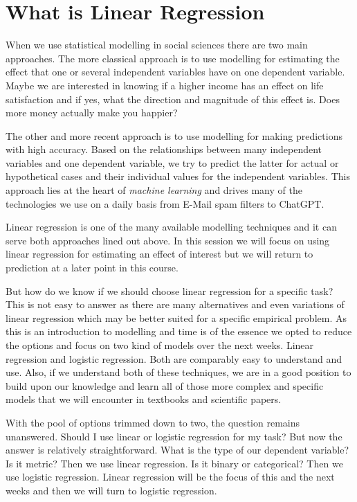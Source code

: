 \documentclass[
]{book}
\begin{document}
\hypertarget{what-is-linear-regression}{%
\section{What is Linear Regression}\label{what-is-linear-regression}}

When we use statistical modelling in social sciences there are two main
approaches.
The more classical approach is to use modelling for estimating the effect that
one or several independent variables have on one dependent variable. Maybe we
are interested in knowing if a higher income has an effect on life satisfaction
and if yes, what the direction and magnitude of this effect is. Does more money
actually make you happier?

The other and more recent approach is to use modelling for making predictions
with high accuracy. Based on the relationships between many independent
variables and one dependent variable, we try to predict the latter for actual
or hypothetical cases and their individual values for the independent variables.
This approach lies at the heart of \emph{machine learning} and drives many of the
technologies we use on a daily basis from E-Mail spam filters to ChatGPT.

Linear regression is one of the many available modelling techniques and it can
serve both approaches lined out above. In this session we will focus on using
linear regression for estimating an effect of interest but we will return to
prediction at a later point in this course.

But how do we know if we should choose linear regression for a specific task?
This is not easy to answer as there are many alternatives and even variations of
linear regression which may be better suited for a specific empirical problem.
As this is an introduction to modelling and time is of the essence we opted to
reduce the options and focus on two kind of models over the next weeks. Linear
regression and logistic regression. Both are comparably easy to understand and
use. Also, if we understand both of these techniques, we are in a good position
to build upon our knowledge and learn all of those more complex and specific
models that we will encounter in textbooks and scientific papers.

With the pool of options trimmed down to two, the question remains unanswered.
Should I use linear or logistic regression for my task? But now the answer is
relatively straightforward. What is the type of our dependent variable? Is it
metric? Then we use linear regression. Is it binary or categorical? Then we use
logistic regression. Linear regression will be the focus of this and the next
weeks and then we will turn to logistic regression.
\end{document}
